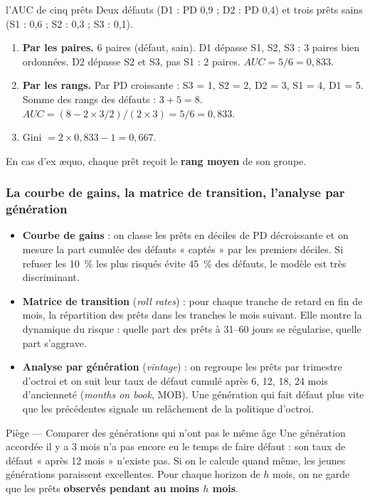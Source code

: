 \begin{calcul}{l'AUC de cinq prêts}
Deux défauts (D1 : PD 0,9 ; D2 : PD 0,4) et trois prêts sains (S1 : 0,6 ; S2 : 0,3 ; S3 : 0,1).
\begin{enumerate}
\item \textbf{Par les paires.} 6 paires (défaut, sain). D1 dépasse S1, S2, S3 : 3 paires bien
ordonnées. D2 dépasse S2 et S3, pas S1 : 2 paires. $AUC = 5/6 = 0{,}833$.
\item \textbf{Par les rangs.} Par PD croissante : S3 = 1, S2 = 2, D2 = 3, S1 = 4, D1 = 5. Somme des rangs
des défauts : $3 + 5 = 8$. $AUC = (8 - 2 \times 3 / 2) / (2 \times 3) = 5/6 = 0{,}833$.
\item Gini $= 2 \times 0{,}833 - 1 = 0{,}667$.
\end{enumerate}
En cas d'ex æquo, chaque prêt reçoit le \textbf{rang moyen} de son groupe.
\end{calcul}

\subsubsection{La courbe de gains, la matrice de transition, l'analyse par génération}

\begin{itemize}
\item \textbf{Courbe de gains} : on classe les prêts en déciles de PD décroissante et on mesure la part
cumulée des défauts « captés » par les premiers déciles. Si refuser les 10~\% les plus risqués évite
45~\% des défauts, le modèle est très discriminant.
\item \textbf{Matrice de transition} (\emph{roll rates}) : pour chaque tranche de retard en fin de mois,
la répartition des prêts dans les tranches le mois suivant. Elle montre la dynamique du risque :
quelle part des prêts à 31--60 jours se régularise, quelle part s'aggrave.
\item \textbf{Analyse par génération} (\emph{vintage}) : on regroupe les prêts par trimestre d'octroi et
on suit leur taux de défaut cumulé après 6, 12, 18, 24 mois d'ancienneté (\emph{months on book}, MOB).
Une génération qui fait défaut plus vite que les précédentes signale un relâchement de la politique
d'octroi.
\end{itemize}

\begin{piege}{Piège --- Comparer des générations qui n'ont pas le même âge}
Une génération accordée il y a 3 mois n'a pas encore eu le temps de faire défaut : son taux de défaut
« après 12 mois » n'existe pas. Si on le calcule quand même, les jeunes générations paraissent
excellentes. Pour chaque horizon de $h$ mois, on ne garde que les prêts \textbf{observés pendant au
moins $h$ mois}.
\end{piege}

